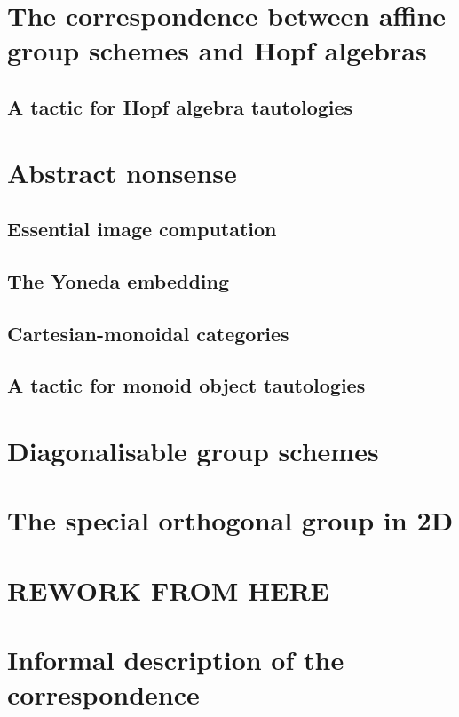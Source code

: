 \documentclass{article}
\begin{document}
\section{The correspondence between affine group schemes and Hopf algebras}


\subsection{A tactic for Hopf algebra tautologies}


\section{Abstract nonsense}


\subsection{Essential image computation}


\subsection{The Yoneda embedding}


\subsection{Cartesian-monoidal categories}


\subsection{A tactic for monoid object tautologies}


\section{Diagonalisable group schemes}


\section{The special orthogonal group in 2D}



\section{REWORK FROM HERE}


\section{Informal description of the correspondence}\label{sec:informal}
\end{document}
